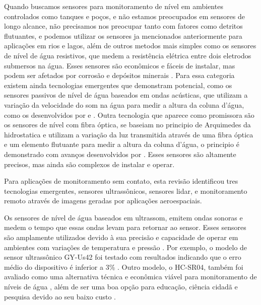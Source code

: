 Quando buscamos sensores para monitoramento de nível em ambientes controlados como tanques e poços, e não estamos preocupados em sensores de longo alcance, não precisamos nos preocupar tanto com fatores como detritos flutuantes, e podemos utilizar os sensores ja mencionados anteriormente para aplicações em rios e lagos, além de outros metodos mais simples como os sensores de nível de água resistivos, que medem a resistência elétrica entre dois eletrodos submersos na água. Esses sensores são econômicos e fáceis de instalar, mas podem ser afetados por corrosão e depósitos minerais \cite{santana_2024_development, mohindru_2023_development}. Para essa categoria existem ainda tecnologias emergentes que demonstram potencial, como os sensores passivos de nível de água baseados em ondas acústicas, que utilizam a variação da velocidade do som na água para medir a altura da coluna d'água, como os desenvolvidos por \textcite{ali_2020_saw} e \textcite{sreejith_2024_modeling}. Outra tecnologia que aparece como promissora são os sensores de nível com fibra óptica, se baseiam no principio de Arquimedes da hidrostatica e utilizam a variação da luz transmitida através de uma fibra óptica e um elemento flutuante para medir a altura da coluna d'água, o principio é demonstrado com avanços desenvolvidos por \textcite{ramos_2025_high}. Esses sensores são altamente precisos, mas ainda são complexos de instalar e operar.

Para aplicações de monitoramento sem contato, esta revisão identificou tres tecnologias emergentes, sensores ultrassônicos, sensores lidar, e monitoramento remoto através de imagens geradas por aplicações aeroespaciais.

Os sensores de nível de água baseados em ultrassom, emitem ondas sonoras e medem o tempo que essas ondas levam para retornar ao sensor. Esses sensores são amplamente utilizados devido à sua precisão e capacidade de operar em ambientes com variações de temperatura e pressão \cite{mohammadrezamasoudimoghaddam_2024_a, pereira_2022_evaluation}. Por exemplo, o modelo de sensor ultrassônico GY-Us42 foi testado com resultados indicando que o erro médio do dispositivo é inferior a 3\% \cite{mohammadrezamasoudimoghaddam_2024_a}. Outro modelo, o HC-SR04, também foi avaliado como uma alternativa técnica e econômica viável para monitoramento de níveis de água \cite{pereira_2022_evaluation}, além de ser uma boa opção para educação, ciência cidadã e pesquisa devido ao seu baixo custo \cite{bresnahan_2023_a}.

